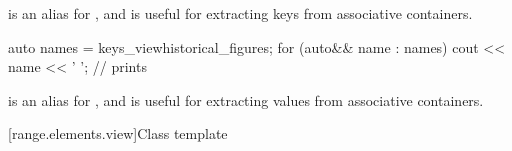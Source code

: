 \pnum
{} is an alias for , and
is useful for extracting keys from associative containers.

\begin{example}
\begin{codeblock}
auto names = keys_view{historical_figures};
for (auto&& name : names) {
  cout << name << ' ';          // prints 
}
\end{codeblock}
\end{example}

\pnum
{} is an alias for , and
is useful for extracting values from associative containers.

\begin{example}
\end{example}

[range.elements.view]{Class template }

